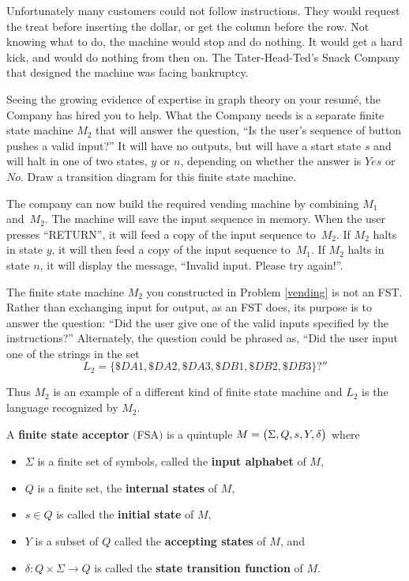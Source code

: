 Unfortunately many customers could not follow instructions.   They would request the treat before inserting the dollar, or get the column before the row.  Not knowing what to do, the machine would stop and do nothing.  It would get a hard kick, and would do nothing from then on.  The Tater-Head-Ted's Snack Company that designed the machine was facing bankruptcy.
\medskip

\begin{prb} \label{vending}
Seeing the growing evidence of expertise in graph theory on your resum{\' e}, the Company has hired you to help.  What the Company needs is a separate finite state machine $M_2$ that will answer the question, ``Is the user's sequence of button pushes a valid input?''  It will have no outputs, but will have a start state $s$ and will halt in one of two states, $y$ or $n$, depending on whether the answer is $Yes$ or $No$.  Draw a transition diagram for this finite state machine.
\end{prb}

\noindent The company can now build the required vending machine by combining $M_1$ and~$M_2$.  The machine will save the input sequence in memory.  When the user presses ``RETURN'', it will feed a copy of the input sequence to~$M_2$.  If $M_2$ halts in state $y$, it will then feed a copy of the input sequence to~$M_1$.  If $M_2$ halts in state $n$, it will display the message, ``Invalid input.  Please try again!''.

The finite state machine $M_2$ you constructed in Problem \ref{vending} is not an FST.  Rather than  exchanging input for output, as an FST does, its purpose is to answer the question:  ``Did the user give one of the valid inputs specified by the instructions?''  Alternately, the question could be phrased as, ``Did the user input one of the strings in the set
\[
L_2 = \{\$DA1, \$DA2, \$DA3, \$DB1, \$DB2, \$DB3\}?''
\]

Thus $M_2$ is an example of a different kind of finite state machine and $L_2$ is the language recognized by $M_2$.
\medskip

\begin{dfn}
A \textbf{finite state acceptor} $($FSA$)$ is a quintuple $\displaystyle M = \big( \Sigma, Q, s, Y, \delta \big)$ where
\begin{itemize}
  \item{} $\Sigma$ is a finite set of symbols, called the \textbf{input alphabet} of $M$,
  \item{} $Q$ is a finite set, the \textbf{internal states} of $M$,
  \item{} $s\in Q$ is called the \textbf{initial state} of $M$,
  \item{} $Y$ is a subset of $Q$ called the \textbf{accepting states} of $M$, and
  \item{} $\delta: Q\times\Sigma \to Q$ is called the \textbf{state transition function} of $M$.
\end{itemize}
\end{dfn}

